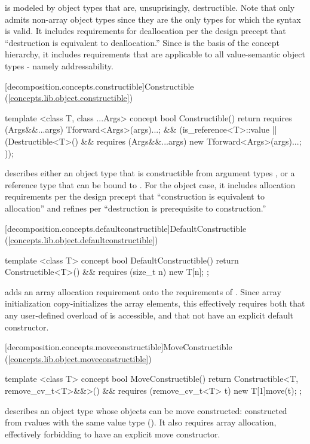  is modeled by object types that are, unsuprisingly, destructible.  Note
that  only admits non-array object types since they are the only types for which
the syntax  is valid. It includes requirements for deallocation per the design
precept that ``destruction is equivalent to deallocation.'' Since  is the basis
of the concept hierarchy, it includes requirements that are applicable to all value-semantic
object types - namely addressability.

[decomposition.concepts.constructible]{Constructible (\ref{concepts.lib.object.constructible})}
\begin{codeblock}
template <class T, class ...Args>
concept bool Constructible() {
  return requires (Args&&...args) {
    T{forward<Args>(args)...};
  } &&
  (is_reference<T>::value ||
    (Destructible<T>() && requires (Args&&...args) {
      new T{forward<Args>(args)...};
    }));
}
\end{codeblock}

 describes either an object type  that is constructible from argument types
, or a reference type  that can be bound to . For the object case,
it includes allocation requirements per the design precept that ``construction is equivalent to allocation''
and refines  per ``destruction is prerequisite to construction.''

[decomposition.concepts.defaultconstructible]{DefaultConstructible (\ref{concepts.lib.object.defaultconstructible})}
\begin{codeblock}
template <class T>
concept bool DefaultConstructible() {
  return Constructible<T>() &&
    requires (size_t n) {
      new T[n]{};
    };
}
\end{codeblock}

 adds an array allocation requirement onto the requirements of
. Since array initialization copy-initializes the array elements,
this effectively requires both that any user-defined overload of  is
accessible, and that  not have an explicit default constructor.

[decomposition.concepts.moveconstructible]{MoveConstructible (\ref{concepts.lib.object.moveconstructible})}
\begin{codeblock}
template <class T>
concept bool MoveConstructible() {
  return Constructible<T, remove_cv_t<T>&&>() &&
    requires (remove_cv_t<T> t) {
      new T[1]{move(t)};
    };
}
\end{codeblock}
 describes an object type  whose objects can be move constructed:
constructed from rvalues with the same value type (). It also requires array
allocation, effectively forbidding  to have an explicit move constructor.

